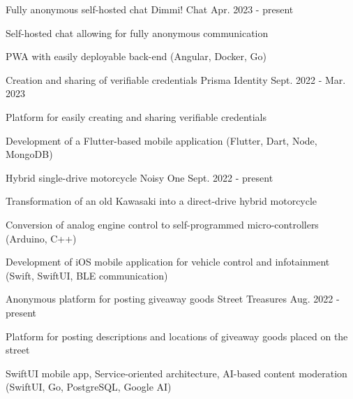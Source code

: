 


\begin{cventries}
\cventry
{Fully anonymous self-hosted chat} %
{Dimmi! Chat} %
{} %
{Apr. 2023 - present} %
{ %
\begin{cvitems}
\item {Self-hosted chat allowing for fully anonymous communication}
\item {PWA with easily deployable back-end (Angular, Docker, Go)}
\end{cvitems}
}
\cventry
{Creation and sharing of verifiable credentials} %
{Prisma Identity} %
{} %
{Sept. 2022 - Mar. 2023} %
{ %
\begin{cvitems}
\item {Platform for easily creating and sharing verifiable credentials}
\item {Development of a Flutter-based mobile application (Flutter, Dart, Node, MongoDB)}
\end{cvitems}
}
\cventry
{Hybrid single-drive motorcycle} %
{Noisy One} %
{} %
{Sept. 2022 - present} %
{ %
\begin{cvitems}
\item {Transformation of an old Kawasaki into a direct-drive hybrid motorcycle}
\item {Conversion of analog engine control to self-programmed micro-controllers (Arduino, C++)}
\item {Development of iOS mobile application for vehicle control and infotainment (Swift, SwiftUI, BLE communication)}
\end{cvitems}
}
\cventry
{Anonymous platform for posting giveaway goods} %
{Street Treasures} %
{} %
{Aug. 2022 - present} %
{ %
\begin{cvitems}
\item {Platform for posting descriptions and locations of giveaway goods placed on the street}
\item {SwiftUI mobile app, Service-oriented architecture, AI-based content moderation (SwiftUI, Go, PostgreSQL, Google AI)}
\end{cvitems}
}



\end{cventries}